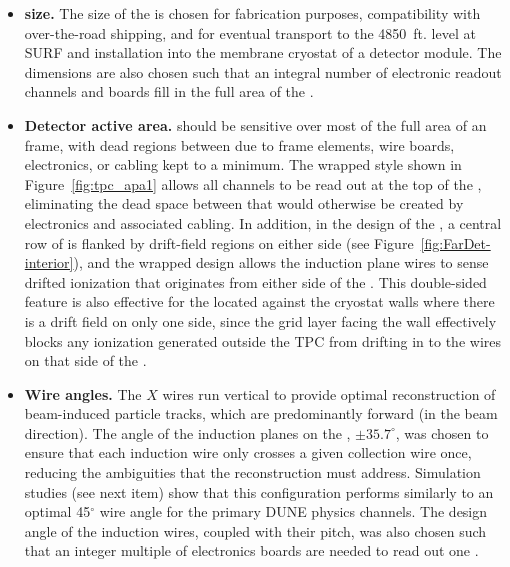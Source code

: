 \begin{itemize}
\item \textbf{ size.} The size of the  is chosen for fabrication purposes, compatibility with over-the-road shipping, and for eventual transport to the \SI{4850}{ft}. level at SURF and installation into the membrane cryostat of a detector module. The dimensions are also chosen such that an integral number of electronic readout channels and boards fill in the full area of the . 

\item \textbf{Detector active area.}  should be sensitive over most of the full area of an  frame, with dead regions between  due to frame elements, wire boards, electronics, or cabling kept to a minimum.  The wrapped style shown in Figure~\ref{fig:tpc_apa1} allows all channels to be read out at the top of the , eliminating the dead space between  that would otherwise be created by electronics and associated cabling. In addition, in the design of the , a central row of  is flanked by drift-field regions on either side (see Figure~\ref{fig:FarDet-interior}), and the wrapped design allows the induction plane wires to sense drifted ionization that originates from either side of the .  This double-sided feature is also effective for the  located against the cryostat walls where there is a drift field on only one side, since the grid layer facing the wall effectively blocks any ionization generated outside the TPC from drifting in to the wires on that side of the .        

\item \textbf{Wire angles.} The $X$ wires run vertical to provide optimal reconstruction of beam-induced particle tracks, which are predominantly forward (in the beam direction). The angle of the induction planes on the , $\pm35.7^{\circ}$, was chosen to ensure that each induction wire only crosses a given collection wire once, reducing the ambiguities that the reconstruction must address.  Simulation studies (see next item) show that this configuration performs similarly to an optimal 45$^\circ$ wire angle for the primary DUNE physics channels.  The design angle of the induction wires, coupled with their pitch, was also chosen such that an integer multiple of electronics boards are needed to read out one .



\end{itemize}
